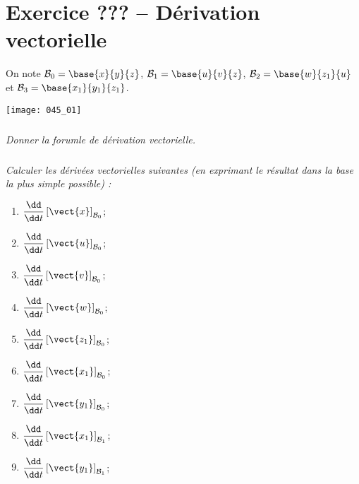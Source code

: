 \section*{Exercice ??? -- Dérivation vectorielle}
\setcounter{exo}{0}


On note $\mathcal{B}_0=\base{x}{y}{z}$, $\mathcal{B}_1=\base{u}{v}{z}$, $\mathcal{B}_2=\base{w}{z_1}{u}$ et $\mathcal{B}_3=\base{x_1}{y_1}{z_1}$.
\begin{center}
\texttt{[image: 045\_01]}
\end{center}


\subparagraph{}
\textit{Donner la forumle de dérivation vectorielle.}

\subparagraph{}
\textit{Calculer les dérivées vectorielles suivantes (en exprimant le résultat dans la base la plus simple possible) : }
\begin{multicols}{3}
\begin{enumerate}
\item $\dfrac{\dd }{\dd t}\left[ \vect{x} \right]_{\mathcal{B}_0}$;
\item $\dfrac{\dd }{\dd t}\left[ \vect{u} \right]_{\mathcal{B}_0}$;
\item $\dfrac{\dd }{\dd t}\left[ \vect{v} \right]_{\mathcal{B}_0}$;
\item $\dfrac{\dd }{\dd t}\left[ \vect{w} \right]_{\mathcal{B}_0}$;
\item $\dfrac{\dd }{\dd t}\left[ \vect{z_1} \right]_{\mathcal{B}_0}$;
\item $\dfrac{\dd }{\dd t}\left[ \vect{x_1} \right]_{\mathcal{B}_0}$;
\item $\dfrac{\dd }{\dd t}\left[ \vect{y_1} \right]_{\mathcal{B}_0}$;
\item $\dfrac{\dd }{\dd t}\left[ \vect{x_1} \right]_{\mathcal{B}_1}$;
\item $\dfrac{\dd }{\dd t}\left[ \vect{y_1} \right]_{\mathcal{B}_1}$;

\end{enumerate}
\end{multicols}


